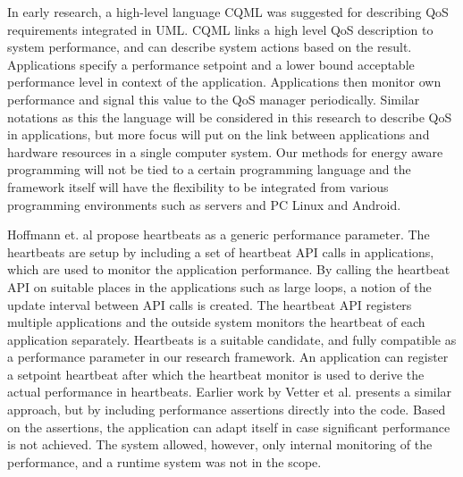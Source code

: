 \documentclass{article}
\begin{document}
In early research, a high-level language CQML \cite{Aagedal:01} was suggested for describing QoS requirements integrated in UML. 
CQML links a high level QoS description to system performance, and can describe system actions based on the result. 
Applications specify a performance setpoint and a lower bound acceptable performance level in context of the application. 
Applications then monitor own performance and signal this value to the QoS manager periodically. 
Similar notations as this the language will be considered in this research to describe QoS in applications, 
but more focus will put on the link between applications and hardware resources in a single computer system.
Our methods for energy aware programming will not be tied to a certain programming language and the framework itself will have the flexibility to be integrated from various programming environments such as servers and PC Linux and Android.

Hoffmann et. al propose heartbeats \cite{Hoffmann:10} as a generic performance parameter. 
The heartbeats are setup by including a set of heartbeat API calls in applications, which are used to monitor the application performance. 
By calling the heartbeat API on suitable places in the applications such as large loops, a notion of the update interval between API calls is created. 
The heartbeat API registers multiple applications and the outside system monitors the heartbeat of each application separately. 
Heartbeats is a suitable candidate, and fully compatible as a performance parameter in our research framework.
An application can register a setpoint heartbeat after which the heartbeat monitor is used to derive the actual performance in heartbeats. 
Earlier work by Vetter et al. \cite{Vetter:02} presents a similar approach, but by including performance assertions directly into the code. 
Based on the assertions, the application can adapt itself in case significant performance is not achieved.
The system allowed, however, only internal monitoring of the performance, and a runtime system was not in the scope.
\end{document}
